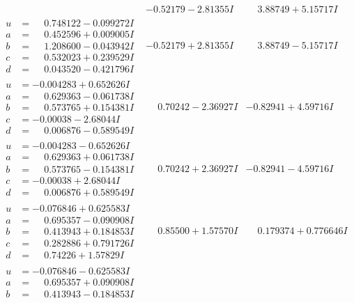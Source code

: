 \documentclass[1p]{elsarticle_modified}
\theoremstyle{definition}
\begin{document}
$$\begin{array}{c|c|c}
 & -0.52179 - 2.81355 I & \phantom{-}3.88749 + 5.15717 I \\ \hline\begin{aligned}
u &= \phantom{-}0.748122 - 0.099272 I \\
a &= \phantom{-}0.452596 + 0.009005 I \\
b &= \phantom{-}1.208600 - 0.043942 I \\
c &= \phantom{-}0.532023 + 0.239529 I \\
d &= \phantom{-}0.043520 - 0.421796 I\end{aligned}
 & -0.52179 + 2.81355 I & \phantom{-}3.88749 - 5.15717 I \\ \hline\begin{aligned}
u &= -0.004283 + 0.652626 I \\
a &= \phantom{-}0.629363 - 0.061738 I \\
b &= \phantom{-}0.573765 + 0.154381 I \\
c &= -0.00038 - 2.68044 I \\
d &= \phantom{-}0.006876 - 0.589549 I\end{aligned}
 & \phantom{-}0.70242 - 2.36927 I & -0.82941 + 4.59716 I \\ \hline\begin{aligned}
u &= -0.004283 - 0.652626 I \\
a &= \phantom{-}0.629363 + 0.061738 I \\
b &= \phantom{-}0.573765 - 0.154381 I \\
c &= -0.00038 + 2.68044 I \\
d &= \phantom{-}0.006876 + 0.589549 I\end{aligned}
 & \phantom{-}0.70242 + 2.36927 I & -0.82941 - 4.59716 I \\ \hline\begin{aligned}
u &= -0.076846 + 0.625583 I \\
a &= \phantom{-}0.695357 - 0.090908 I \\
b &= \phantom{-}0.413943 + 0.184853 I \\
c &= \phantom{-}0.282886 + 0.791726 I \\
d &= \phantom{-}0.74226 + 1.57829 I\end{aligned}
 & \phantom{-}0.85500 + 1.57570 I & \phantom{-}0.179374 + 0.776646 I \\ \hline\begin{aligned}
u &= -0.076846 - 0.625583 I \\
a &= \phantom{-}0.695357 + 0.090908 I \\
b &= \phantom{-}0.413943 - 0.184853 I \\

\end{aligned}
\end{array}$$
\end{document}
